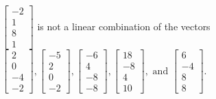 \begin{exercise}
\begin{exerciseStatement}
  \end{exerciseStatement}
  \begin{exerciseAnswer}
   \(\left[\begin{array}{c}
-2 \\
1 \\
8 \\
1
\end{array}\right]\) 
  	 is not  
	a linear combination of the vectors \(\left[\begin{array}{c}
2 \\
0 \\
-4 \\
-2
\end{array}\right] , \left[\begin{array}{c}
-5 \\
2 \\
0 \\
-2
\end{array}\right] , \left[\begin{array}{c}
-6 \\
4 \\
-8 \\
-8
\end{array}\right] , \left[\begin{array}{c}
18 \\
-8 \\
4 \\
10
\end{array}\right] , \text{ and } \left[\begin{array}{c}
6 \\
-4 \\
8 \\
8
\end{array}\right]\).

	
  


  \end{exerciseAnswer}
\end{exercise}